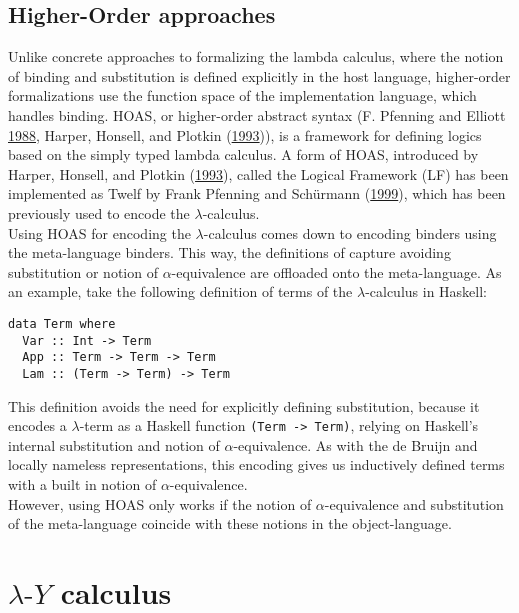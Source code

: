 \documentclass[a4paper, 12pt, twoside]{style/ociamthesis}
\theoremstyle{plain}
\theoremstyle{definition}
\theoremstyle{remark}
\newcommand{\lamy}{\lambda\text{-}Y}
\begin{document}
\subsection{Higher-Order approaches}\label{higher-order-approaches}

Unlike concrete approaches to formalizing the lambda calculus, where the
notion of binding and substitution is defined explicitly in the host
language, higher-order formalizations use the function space of the
implementation language, which handles binding. HOAS, or higher-order
abstract syntax (F. Pfenning and Elliott
\protect\hyperlink{ref-pfenning88}{1988}, Harper, Honsell, and Plotkin
(\protect\hyperlink{ref-harper93}{1993})), is a framework for defining
logics based on the simply typed lambda calculus. A form of HOAS,
introduced by Harper, Honsell, and Plotkin
(\protect\hyperlink{ref-harper93}{1993}), called the Logical Framework
(LF) has been implemented as Twelf by Frank Pfenning and Schürmann
(\protect\hyperlink{ref-pfenning99}{1999}), which has been previously
used to encode the \(\lambda\)-calculus.\\
Using HOAS for encoding the \(\lambda\)-calculus comes down to encoding
binders using the meta-language binders. This way, the definitions of
capture avoiding substitution or notion of \(\alpha\)-equivalence are
offloaded onto the meta-language. As an example, take the following
definition of terms of the \(\lambda\)-calculus in Haskell:

\begin{verbatim}
data Term where
  Var :: Int -> Term
  App :: Term -> Term -> Term
  Lam :: (Term -> Term) -> Term
\end{verbatim}

This definition avoids the need for explicitly defining substitution,
because it encodes a \(\lambda\)-term as a Haskell function
\texttt{(Term -> Term)}, relying on Haskell's internal substitution and
notion of \(\alpha\)-equivalence. As with the de Bruijn and locally
nameless representations, this encoding gives us inductively defined
terms with a built in notion of \(\alpha\)-equivalence.\\
However, using HOAS only works if the notion of \(\alpha\)-equivalence
and substitution of the meta-language coincide with these notions in the
object-language.

\newpage

\section{\texorpdfstring{\(\lamy\)
calculus}{\textbackslash{}lamy calculus}}\label{lamy-calculus}
\end{document}
